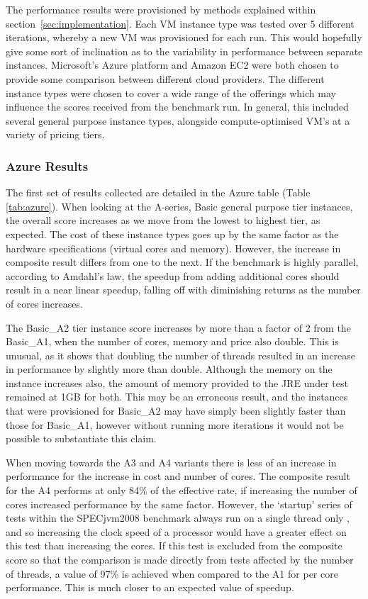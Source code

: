 \documentclass[conference]{IEEEtran}
\begin{document}
The performance results were provisioned by methods explained within section~\ref{sec:implementation}. Each VM instance type was tested over 5 different iterations, whereby a new VM was provisioned for each run. This would hopefully give some sort of inclination as to the variability in performance between separate instances. Microsoft's Azure platform and Amazon EC2 were both chosen to provide some comparison between different cloud providers. The different instance types were chosen to cover a wide range of the offerings which may influence the scores received from the benchmark run. In general, this included several general purpose instance types, alongside compute-optimised VM's at a variety of pricing tiers.

\subsubsection{Azure Results}\label{sec:eval:azureresults}

The first set of results collected are detailed in the Azure table (Table \ref{tab:azure}). When looking at the A-series, Basic general purpose tier instances, the overall score increases as we move from the lowest to highest tier, as expected. The cost of these instance types goes up by the same factor as the hardware specifications (virtual cores and memory). However, the increase in composite result differs from one to the next. If the benchmark is highly parallel, according to Amdahl's law, the speedup from adding additional cores should result in a near linear speedup, falling off with diminishing returns as the number of cores increases.

The Basic\_A2 tier instance score increases by more than a factor of 2 from the Basic\_A1, when the number of cores, memory and price also double. This is unusual, as it shows that doubling the number of threads resulted in an increase in performance by slightly more than double. Although the memory on the instance increases also, the amount of memory provided to the JRE under test remained at 1GB for both. This may be an erroneous result, and the instances that were provisioned for Basic\_A2 may have simply been slightly faster than those for Basic\_A1, however without running more iterations it would not be possible to substantiate this claim.

When moving towards the A3 and A4 variants there is less of an increase in performance for the increase in cost and number of cores. The composite result for the A4 performs at only 84\% of the effective rate, if increasing the number of cores increased performance by the same factor. However, the `startup' series of tests within the SPECjvm2008 benchmark always run on a single thread only \cite{specjvmguide}, and so increasing the clock speed of a processor would have a greater effect on this test than increasing the cores. If this test is excluded from the composite score so that the comparison is made directly from tests affected by the number of threads, a value of 97\% is achieved when compared to the A1 for per core performance. This is much closer to an expected value of speedup.
\end{document}
